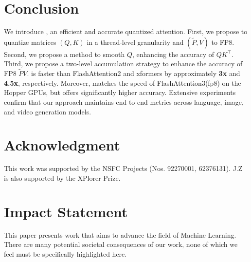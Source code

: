 
\section{Conclusion}
\vspace{-.1em}
We introduce \our, an efficient and accurate quantized attention. First, we propose to quantize matrices $(Q, K)$ in a thread-level granularity and $(\widetilde P, V)$ to FP8. Second, we propose a method to smooth $Q$, enhancing the accuracy of $QK^\top$. Third, we propose a two-level accumulation strategy to enhance the accuracy of FP8 $\widetilde PV$. \our is faster than FlashAttention2 and xformers by approximately \textbf{3x} and \textbf{4.5x}, respectively. Moreover, \our matches the speed of FlashAttention3(fp8) on the Hopper GPUs, but offers significantly higher accuracy. Extensive experiments confirm that our approach maintains end-to-end metrics across language, image, and video generation models. 


\section*{Acknowledgment}
This work was supported by the NSFC Projects (Nos. 92270001, 62376131). J.Z is also supported by the XPlorer Prize.




\section*{Impact Statement}
This paper presents work that aims to advance the field of Machine Learning. There are many potential societal consequences of our work, none of which we feel must be specifically highlighted here.